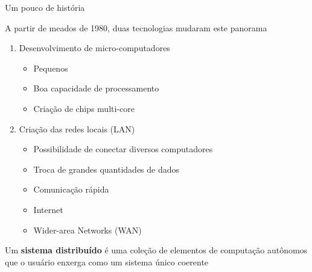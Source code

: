 \documentclass[compress]{beamer}
\begin{document}

\begin{frame}{Um pouco de história}

A partir de meados de 1980, duas tecnologias mudaram este panorama

\vspace{0.5cm}

\begin{enumerate}
    \item Desenvolvimento de micro-computadores
    \begin{itemize}
        \item Pequenos
        \item Boa capacidade de processamento
        \item Criação de chips multi-core
    \end{itemize}
    \vspace{0.5cm}
    \item Criação das redes locais (LAN)
    \begin{itemize}
        \item Possibilidade de conectar diversos computadores
        \item Troca de grandes quantidades de dados
        \item Comunicação rápida
        \item Internet
        \item Wider-area Networks (WAN)
    \end{itemize}
\end{enumerate}

\end{frame}


\begin{section}{Um \textbf{sistema distribuído} é uma coleção de elementos de computação autônomos que o usuário enxerga como um sistema único coerente}
\end{section}

\end{document}
